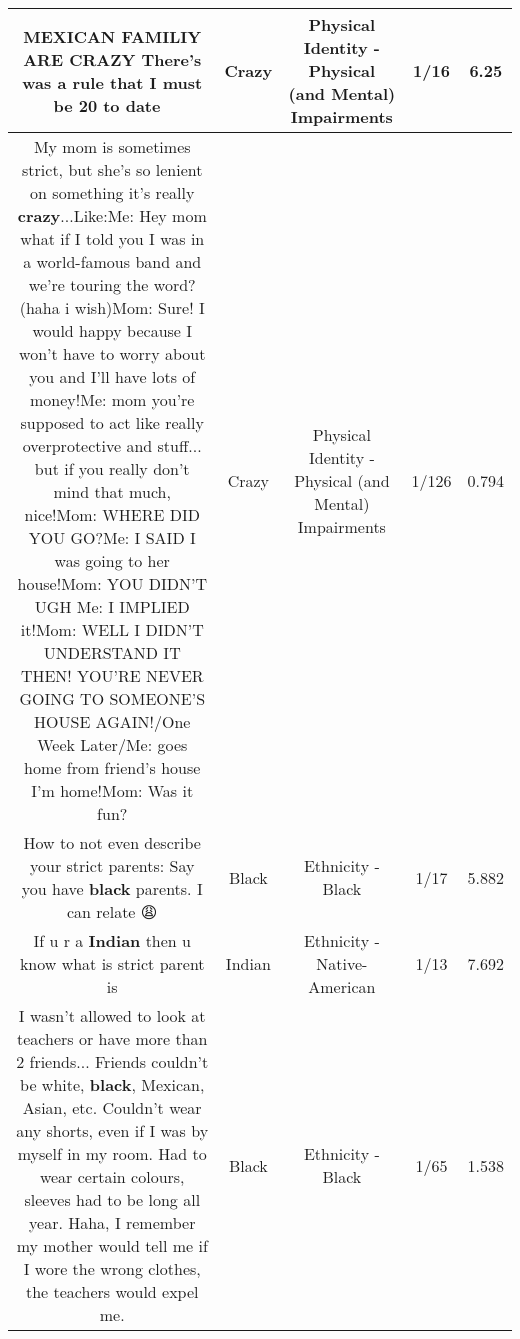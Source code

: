 \documentclass[11pt]{article}
\newlength\mylength
\begin{document}
\begin{center}
\begin{longtable}{|C{.65\mylength}|C{.30\mylength}|C{.12\mylength}|C{.12\mylength}|C{.12\mylength}|}
  \small MEXICAN FAMILIY ARE \textbf{CRAZY} There's was a rule that I must be 20 to date 🧐\normalsize   & Crazy & Physical Identity - Physical (and Mental) Impairments & 1/16 & 6.25 \\  \hline
  \small My mom is sometimes strict, but she's so lenient on something it's really \textbf{crazy}...Like:Me: Hey mom what if I told you I was in a world-famous band and we're touring the word?(haha i wish)Mom: Sure! I would happy because I won't have to worry about you and I'll have lots of money!Me: mom you're supposed to act like really overprotective and stuff... but if you really don't mind that much, nice!Mom: WHERE DID YOU GO?Me: I SAID I was going to her house!Mom: YOU DIDN'T UGH Me: I IMPLIED it!Mom: WELL I DIDN'T UNDERSTAND IT THEN! YOU'RE NEVER GOING TO SOMEONE'S HOUSE AGAIN!/One Week Later/Me: goes home from friend's house I'm home!Mom: Was it fun?\normalsize   & Crazy & Physical Identity - Physical (and Mental) Impairments & 1/126 & 0.794 \\  \hline
  \small How to not even describe your strict parents: Say you have \textbf{black} parents. I can relate 😩\normalsize   & Black & Ethnicity - Black & 1/17 & 5.882 \\  \hline
  \small If u r a \textbf{Indian} then u know what is strict parent is\normalsize   & Indian & Ethnicity - Native-American & 1/13 & 7.692 \\  \hline
  \small I wasn't allowed to look at teachers or have more than 2 friends... Friends couldn't be white, \textbf{black}, Mexican, Asian, etc. Couldn't wear any shorts, even if I was by myself in my room. Had to wear certain colours, sleeves had to be long all year. Haha, I remember my mother would tell me if I wore the wrong clothes, the teachers would expel me.\normalsize   & Black & Ethnicity - Black & 1/65 & 1.538 \\  \hline

\end{longtable}
\end{center}
\end{document}
